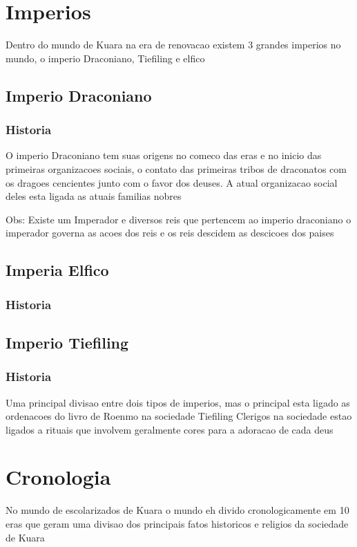 \documentclass{book}
\begin{document}
\chapter{Imperios}
Dentro do mundo de Kuara na era de renovacao existem 3 grandes imperios no mundo, o imperio 
Draconiano, Tiefiling e elfico 

\section{Imperio Draconiano}

\subsection*{Historia}
O imperio Draconiano tem suas origens no comeco das eras e no inicio das primeiras 
organizacoes sociais, o contato das primeiras tribos de draconatos com os dragoes cencientes 
junto com o favor dos deuses. A atual organizacao social deles esta ligada as atuais 
familias nobres 

Obs: Existe um Imperador e diversos reis que pertencem ao imperio draconiano o imperador 
governa as acoes dos reis e os reis descidem as descicoes dos paises 

\section{Imperia Elfico}
\subsection*{Historia}


\section{Imperio Tiefiling}
\subsection*{Historia}
Uma principal divisao entre dois tipos de imperios, mas o principal esta ligado as ordenacoes 
do livro de Roenmo na sociedade Tiefiling
Clerigos na sociedade estao ligados a rituais que involvem geralmente cores para a adoracao de 
cada deus

\chapter{Cronologia}
No mundo de escolarizados de Kuara o mundo eh divido cronologicamente em 10 eras que geram uma 
divisao dos principais fatos historicos e religios da sociedade de Kuara 
\end{document}
